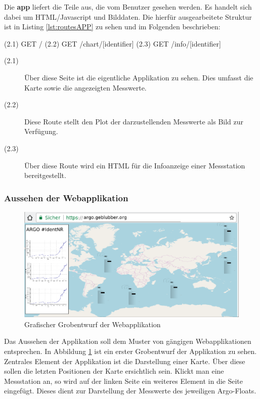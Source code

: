 Die \textbf{app} liefert die Teile aus, die vom Benutzer gesehen werden. Es handelt sich dabei um HTML/Javascript und Bilddaten. Die hierfür ausgearbeitete Struktur ist in Listing \ref{lst:routesAPP} zu sehen und im Folgenden beschrieben:

\begin{python}[label={lst:routesAPP}, caption={Webrouten der Darstellung}]
(2.1) GET     /
(2.2) GET     /chart/[identifier]
(2.3) GET     /info/[identifier]
\end{python}

\begin{description}
 \item [(2.1)]
 Über diese Seite ist die eigentliche Applikation zu sehen. Dies umfasst die Karte sowie die angezeigten Messwerte.

 \item [(2.2)]
 Diese Route stellt den Plot der darzustellenden Messwerte als Bild zur Verfügung.

 \item [(2.3)]
 Über diese Route wird ein \gls{HTML} für die Infoanzeige einer Messstation bereitgestellt.

\end{description}


\pagebreak
\subsubsection{Aussehen der Webapplikation}
%
%

\begin{figure}[h!]
    \centering
    \includegraphics[width=\textwidth]{pix/EntwurfWebseite.png}
    \caption{Grafischer Grobentwurf der Webapplikation}
    \label{fig:entwurf_webseite}
\end{figure}

Das Aussehen der Applikation soll dem Muster von gängigen Webapplikationen entsprechen. In Abbildung \ref{fig:entwurf_webseite} ist ein erster Grobentwurf der Applikation zu sehen.
Zentrales Element der Applikation ist die Darstellung einer Karte. Über diese sollen die letzten Positionen der Karte ersichtlich sein.
Klickt man eine Messstation an, so wird auf der linken Seite ein weiteres Element in die Seite eingefügt. Dieses dient zur Darstellung der Messwerte des jeweiligen Argo-Floats.






